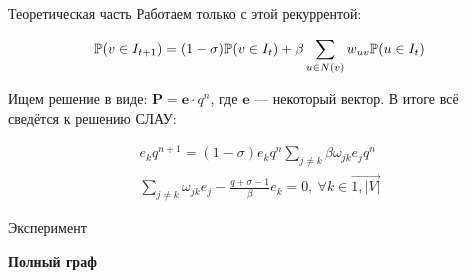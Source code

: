 	\begin{frame}{Теоретическая часть}
		Работаем только с этой рекуррентой:
		
		\begin{equation*}
			\mathbb{P}(v \in I_{t+1}) = (1 - \sigma) \mathbb{P}(v \in I_t) + \beta \sum\limits_{u \in N(v)} w_{uv} \mathbb{P}(u \in I_t)
		\end{equation*}
	
	Ищем решение в виде: $ \mathbf{P} = \mathbf{e} \cdot q^n$, где $\mathbf{e}$ --- некоторый вектор. В итоге всё сведётся к решению СЛАУ:
	
	\begin{gather*}
		e_k q^{n+1} = (1 - \sigma) e_k q^n \sum\limits_{j \not= k} \beta \omega_{jk} e_j q^n \\
		\sum\limits_{j \not= k} \omega_{jk} e_j - \frac{q + \sigma - 1}{\beta} e_k = 0, \  \forall k \in \overrightarrow{1, |V|}
	\end{gather*}
		
	\end{frame}

	\begin{frame}{Эксперимент}
		\renewcommand{\thesubfigure}{}
		
		\begin{figure}
		\end{figure}

	\begin{center}
		\textbf{{\large Полный граф}}
	\end{center}
		
	\end{frame}

